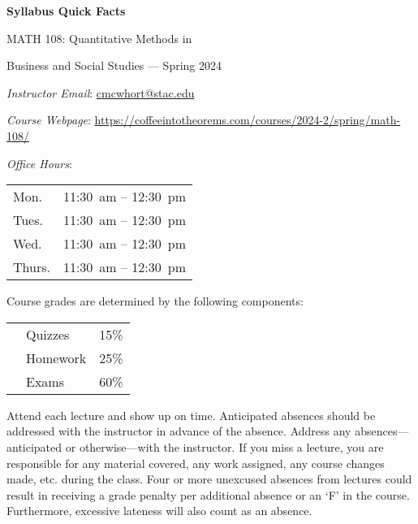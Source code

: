 \documentclass[11pt,letterpaper]{article}
\begin{document}
\begin{center} 
\bfseries
\color{stacred}
\LARGE Syllabus Quick Facts \par\vspace{0.2\baselineskip}
\Large MATH 108: Quantitative Methods in \par Business and Social Studies --- Spring 2024
\end{center} \pspace


\hspace{0.53cm} {\itshape Instructor Email}: \href{mailto:cmcwhort@stac.edu}{cmcwhort@stac.edu} \par
\hspace{0.53cm} {\itshape Course Webpage}: \href{https://coffeeintotheorems.com/courses/2024-2/spring/math-108/}{https://coffeeintotheorems.com/courses/2024-2/spring/math-108/} \par
\hspace{0.53cm} {\itshape Office Hours}: 	\par \vspace{-0.3cm}
	\begin{table}[!ht]
	\centering
	\begin{tabular}{l || l}
	Mon. & 11:30~am -- 12:30~pm \\
	Tues. & 11:30~am -- 12:30~pm \\
	Wed. & 11:30~am -- 12:30~pm \\
	Thurs. & 11:30~am -- 12:30~pm
	\end{tabular}
	\end{table}


Course grades are determined by the following components: \par \vspace{-0.3cm}
	\begin{table}[!ht]
        \begin{tabular}{clr}
	& Quizzes & 15\% \\
	& Homework & 25\% \\
	& Exams & 60\%
        \end{tabular} 
        \end{table}


Attend each lecture and show up on time. Anticipated absences should be addressed with the instructor in advance of the absence. Address any absences---anticipated or otherwise---with the instructor. If you miss a lecture, you are responsible for any material covered, any work assigned, any course changes made, etc. during the class. Four or more unexcused absences from lectures could result in receiving a grade penalty per additional absence or an `F' in the course. Furthermore, excessive lateness will also count as an absence. \pspace
\end{document}
